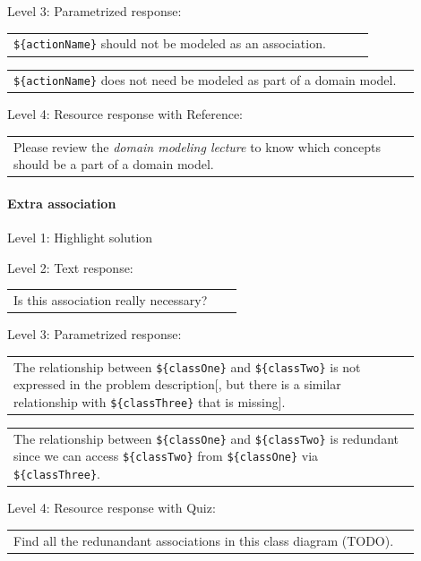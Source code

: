 \noindent Level 3: Parametrized response: \medskip

\begin{tabular}{|p{0.9\linewidth}}
\verb|${actionName}| should not be modeled as an association.
\end{tabular} \medskip

\begin{tabular}{|p{0.9\linewidth}}
\verb|${actionName}| does not need be modeled as part of a domain model.
\end{tabular} \medskip

\noindent Level 4: Resource response with Reference: \medskip

\begin{tabular}{|p{0.9\linewidth}}
Please review the \textit{domain modeling lecture} to know which concepts should be a part of a domain model.
\end{tabular} \medskip


\paragraph{Extra association}

\noindent Level 1: Highlight solution \medskip

\noindent Level 2: Text response: \medskip

\begin{tabular}{|p{0.9\linewidth}}
Is this association really necessary?
\end{tabular} \medskip

\noindent Level 3: Parametrized response: \medskip

\begin{tabular}{|p{0.9\linewidth}}
The relationship between \verb|${classOne}| and \verb|${classTwo}| is not expressed in the problem description[, but there is a similar relationship with \verb|${classThree}| that is missing].
\end{tabular} \medskip

\begin{tabular}{|p{0.9\linewidth}}
The relationship between \verb|${classOne}| and \verb|${classTwo}| is redundant since we can access \verb|${classTwo}| from \verb|${classOne}| via \verb|${classThree}|.
\end{tabular} \medskip

\noindent Level 4: Resource response with Quiz: \medskip

\begin{tabular}{|p{0.9\linewidth}}
Find all the redunandant associations in this class diagram (TODO).
\end{tabular} \medskip



